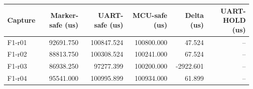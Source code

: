 \begin{tabular}{lrrrrr}
Capture & Marker-safe (us) & UART-safe (us) & MCU-safe (us) & Delta (us) & UART-HOLD (us) \\
\hline
F1-r01 & 92691.750 & 100847.524 & 100800.000 & 47.524 & -- \\
F1-r02 & 88813.750 & 100308.524 & 100241.000 & 67.524 & -- \\
F1-r03 & 86938.250 & 97277.399 & 100200.000 & -2922.601 & -- \\
F1-r04 & 95541.000 & 100995.899 & 100934.000 & 61.899 & -- \\
\end{tabular}
